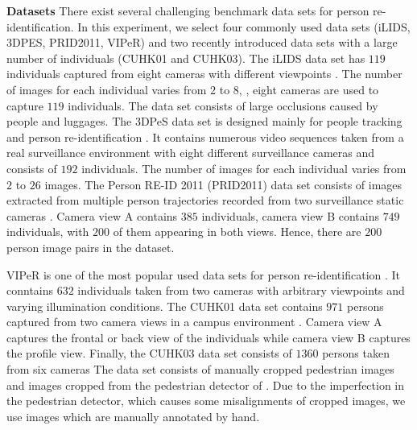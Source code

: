 \documentclass[10pt,twocolumn,letterpaper]{article}
\renewcommand{\paragraph}{\textbf}
\begin{document}
\paragraph{Datasets}
There exist several challenging benchmark data sets for person re-identification.
In this experiment, we select four commonly used data sets
(iLIDS, 3DPES, PRID2011, VIPeR)
and two recently introduced data sets with a large number of individuals
(CUHK01 and CUHK03).
The iLIDS data set has $119$ individuals captured from eight cameras with
different viewpoints \cite{Zheng2009Associating}.
The number of images for each individual
varies from $2$ to $8$, \ie, eight cameras are used to capture $119$ individuals.
The data set consists of large occlusions caused by people and luggages.
The 3DPeS data set is designed mainly for people tracking
and person re-identification \cite{Baltieri20113dpes}.
It contains numerous video sequences taken from a real surveillance environment
with eight different surveillance cameras and
consists of $192$ individuals.
The number of images for each individual varies from $2$ to $26$ images.
The Person RE-ID 2011 (PRID2011) data set consists of images extracted
from multiple person trajectories recorded from two surveillance
static cameras \cite{Hirzer2011Person}.
Camera view A contains $385$ individuals, camera view B contains $749$ individuals,
with $200$ of them appearing in both views.
Hence, there are $200$ person image pairs in the dataset.



VIPeR is one of the most popular used data sets for
person re-identification \cite{Gray2007Evaluating}.
It conntains $632$ individuals taken from two cameras with
arbitrary viewpoints and varying illumination conditions.
The CUHK01 data set contains $971$ persons captured from two camera views in a campus
environment \cite{Li2012Human}.
Camera view A captures the frontal or back view of the individuals while
camera view B captures the profile view.
Finally, the CUHK03 data set consists of $1360$ persons taken from six cameras \cite{Li2014Deep}
The data set consists of manually cropped pedestrian images and
images cropped from the pedestrian detector of \cite{Felzenszwalb2010Object}.
Due to the imperfection in the pedestrian detector, which
causes some misalignments of cropped images,
we use images which are manually annotated by hand.
\end{document}
